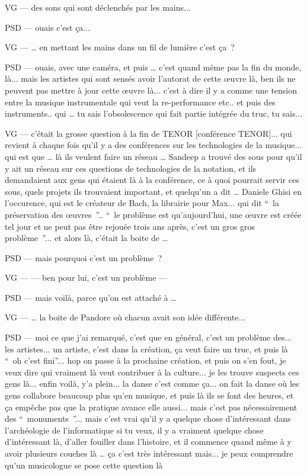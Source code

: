 VG — des sons qui sont déclenchés par les mains... 

PSD — ouais c'est ça... 

VG — … en mettant les mains dans un fil de lumière c'est ça ? 

PSD — ouais, avec une caméra, et puis … c'est quand même pas la fin du monde, là... mais les artistes qui sont sensés avoir l'autorat de cette œuvre là, ben ils ne peuvent pas mettre à jour cette œuvre là... c'est à dire il y a comme une tension entre la musique instrumentale qui veut la re-performance etc.. et puis des instruments.. qui … tu sais l'obsolescence qui fait partie intégrée du truc, tu sais... 

VG — c'était la grosse question à la fin de TENOR [conférence TENOR]... qui revient à chaque fois qu'il y a des conférences sur les technologies de la musique... qui est que … là ils veulent faire un réseau … Sandeep a trouvé des sous pour qu'il y ait un réseau sur ces questions de technologies de la notation, et ils demandaient aux gens qui étaient là à la conférence, ce à quoi pourrait servir ces sous, quels projets ils trouvaient important, et quelqu'un a dit … Daniele Ghisi en l'occurence, qui est le créateur de Bach, la librairie pour Max... qui dit “ la préservation des œuvres ”.. “ le problème est qu'aujourd'hui, une œuvre est créée tel jour et ne peut pas être rejouée trois ans après, c'est un gros gros problème ”... et alors là, c'était la boite de … 

PSD — mais pourquoi c'est un problème ? 

VG — — ben pour lui, c'est un problème — 

PSD — mais voilà, parce qu'on est attaché à … 

VG — … la boite de Pandore où chacun avait son idée différente... 

PSD — moi ce que j'ai remarqué, c'est que en général, c'est un problème des... les artistes... un artiste, c'est dans la création, ça veut faire un truc, et puis là “ oh c'est fini”... hop on passe à la prochaine création, et puis on s'en fout, je veux dire qui vraiment là veut contribuer à la culture... je les trouve suspects ces gens là... enfin voilà, y'a plein... la danse c'est comme ça... on fait la danse où les gens collabore beaucoup plus qu'en musique, et puis là ils se font des heures, et ça empêche pas que la pratique avance elle aussi... mais c'est pas nécessairement des “ monuments ”... mais c'est vrai qu'il y a quelque chose d'intéressant dans l'archéologie de l'informatique si tu veux, il y a vraiment quelque chose d'intéressant là, d'aller fouiller dans l'histoire, et il commence quand même à y avoir plusieurs couches là … ça c'est très intéressant mais... je peux comprendre qu'un musicologue se pose cette question là 

